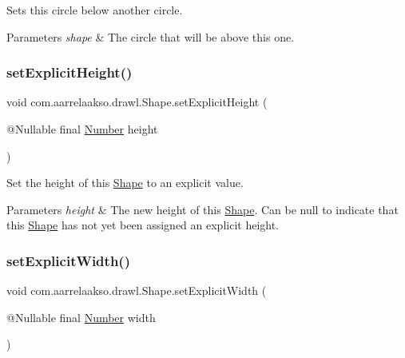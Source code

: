 Sets this circle below another circle. 


\begin{DoxyParams}{Parameters}
{\em shape} & The circle that will be above this one. \\
\hline
\end{DoxyParams}
\mbox{\label{classcom_1_1aarrelaakso_1_1drawl_1_1_shape_a3680a63cef0d766132d1f64813ca8eca}} 
\subsubsection{\texorpdfstring{set\+Explicit\+Height()}{setExplicitHeight()}}
{\footnotesize\ttfamily void com.\+aarrelaakso.\+drawl.\+Shape.\+set\+Explicit\+Height (\begin{DoxyParamCaption}\item[{@Nullable final \hyperlink{interfacecom_1_1aarrelaakso_1_1drawl_1_1_number}{Number}}]{height }\end{DoxyParamCaption})\hspace{0.3cm}{\ttfamily [protected]}}



Set the height of this \hyperlink{classcom_1_1aarrelaakso_1_1drawl_1_1_shape}{Shape} to an explicit value. 


\begin{DoxyParams}{Parameters}
{\em height} & The new height of this \hyperlink{classcom_1_1aarrelaakso_1_1drawl_1_1_shape}{Shape}. Can be {\ttfamily null} to indicate that this \hyperlink{classcom_1_1aarrelaakso_1_1drawl_1_1_shape}{Shape} has not yet been assigned an explicit height. \\
\hline
\end{DoxyParams}
\mbox{\label{classcom_1_1aarrelaakso_1_1drawl_1_1_shape_a386685477bfc007aab782565f140265d}} 
\subsubsection{\texorpdfstring{set\+Explicit\+Width()}{setExplicitWidth()}}
{\footnotesize\ttfamily void com.\+aarrelaakso.\+drawl.\+Shape.\+set\+Explicit\+Width (\begin{DoxyParamCaption}\item[{@Nullable final \hyperlink{interfacecom_1_1aarrelaakso_1_1drawl_1_1_number}{Number}}]{width }\end{DoxyParamCaption})\hspace{0.3cm}{\ttfamily [protected]}}



